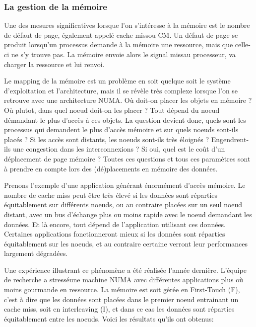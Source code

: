   \subsubsection{La gestion de la mémoire}
  
    Une des mesures significatives lorsque l'on s'intéresse à la mémoire est le
    nombre de défaut de page, également appelé \og cache miss\fg ou \og CM\fg. Un
    défaut de page se produit lorsqu'un processus demande à la mémoire une
    ressource, mais que celle-ci ne s'y trouve pas. La mémoire envoie alors le signal
    \og miss\fg au processeur, va charger la ressource et lui renvoi.

    Le mapping de la mémoire est un problème en soit quelque soit le système
    d'exploitation et l'architecture, mais il se révèle très complexe lorsque
    l'on se retrouve avec une architecture NUMA. Où doit-on placer les objets en
    mémoire ? Où plutot, dans quel noeud doit-on les placer ? Tout dépend du
    noeud démandant le plus d'accès à ces objets. La question devient donc,
    quels sont les processus qui demandent le plus d'accès mémoire et sur quels
    noeuds sont-ils placés ? Si les accès sont distants, les noeuds sont-ils
    très éloignés ? Engendrent-ils une congestion dans les interconnexions ? Si
    oui, quel est le coût d'un déplacement de page mémoire ?  Toutes ces
    questions et tous ces paramètres sont à prendre en compte lors des
    (dé)placements en mémoire des données.

    Prenons l'exemple d'une application générant énormément d'accès mémoire. Le
    nombre de cache miss peut être très élevé si les données sont réparties
    équitablement sur différents noeuds, ou au contraire placées sur un seul
    noeud distant, avec un bus d'échange plus ou moins rapide avec le noeud
    demandant les données. Et là encore, tout dépend de l'application utilisant
    ces données. Certaines applications fonctionneront mieux si les données sont
    réparties équitablement sur les noeuds, et au contraire certaine verront
    leur performances largement dégradées.

    Une expérience illustrant ce phénomène a été réalisée l'année
    dernière\cite{Holistic2013}. L'équipe de recherche a \og stressé\fg une
    machine NUMA avec différentes applications plus où moins gourmande en
    ressource. La mémoire est soit gérée en \og First-Touch (F)\fg, c'est à dire
    que les données sont placées dans le premier noeud entrainant un cache miss,
    soit en \og interleaving (I)\fg, et dans ce cas les données sont réparties
    équitablement entre les noeuds. Voici les résultats qu'ils ont obtenus:

